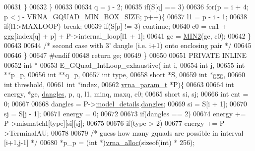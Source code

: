 \begin{DoxyCode}
00631       \}
00632     \}
00633 
00634     q = j - 2;
00635     \textcolor{keywordflow}{if}(S[q] == 3)
00636       \textcolor{keywordflow}{for}(p = i + 4; p < j - VRNA\_GQUAD\_MIN\_BOX\_SIZE; p++)\{
00637         l1    = p - i - 1;
00638         \textcolor{keywordflow}{if}(l1>MAXLOOP) \textcolor{keywordflow}{break};
00639         \textcolor{keywordflow}{if}(S[p] != 3) \textcolor{keywordflow}{continue};
00640         c0  = en1 + ggg[index[q] + p] + P->internal\_loop[l1 + 1];
00641         ge  = \hyperlink{group__utils_ga2dd4a927a7f937f43a90c144d79107d8}{MIN2}(ge, c0);
00642       \}
00643 
00644     \textcolor{comment}{/* second case with 3' dangle (i.e. i+1) onto enclosing pair */}
00645 
00646   \}
00647 \textcolor{preprocessor}{#endif}
00648   \textcolor{keywordflow}{return} ge;
00649 \}
00650 
00651 PRIVATE INLINE
00652 \textcolor{keywordtype}{int} *
00653 E\_GQuad\_IntLoop\_exhaustive( \textcolor{keywordtype}{int} i,
00654                             \textcolor{keywordtype}{int} j,
00655                             \textcolor{keywordtype}{int} **p\_p,
00656                             \textcolor{keywordtype}{int} **q\_p,
00657                             \textcolor{keywordtype}{int} type,
00658                             \textcolor{keywordtype}{short} *S,
00659                             \textcolor{keywordtype}{int} *ggg,
00660                             \textcolor{keywordtype}{int} threshold,
00661                             \textcolor{keywordtype}{int} *index,
00662                             \hyperlink{group__energy__parameters_structvrna__param__s}{vrna\_param\_t} *P)\{
00663 
00664   \textcolor{keywordtype}{int} energy, *ge, \hyperlink{group__model__details_ga72b511ed1201f7e23ec437e468790d74}{dangles}, p, q, l1, minq, maxq, c0;
00665   \textcolor{keywordtype}{short} si, sj;
00666   \textcolor{keywordtype}{int} cnt = 0;
00667 
00668   dangles = P->\hyperlink{group__energy__parameters_a7b84353eb9075c595bad4ceb871bcae7}{model\_details}.\hyperlink{structvrna__md__s_adcda4ff2ea77748ae0e8700288282efc}{dangles};
00669   si      = S[i + 1];
00670   sj      = S[j - 1];
00671   energy  = 0;
00672 
00673   \textcolor{keywordflow}{if}(dangles == 2)
00674     energy += P->mismatchI[type][si][sj];
00675 
00676   \textcolor{keywordflow}{if}(type > 2)
00677     energy += P->TerminalAU;
00678 
00679   \textcolor{comment}{/* guess how many gquads are possible in interval [i+1,j-1] */}
00680   *p\_p  = (\textcolor{keywordtype}{int} *)\hyperlink{group__utils_gaf37a0979367c977edfb9da6614eebe99}{vrna\_alloc}(\textcolor{keyword}{sizeof}(\textcolor{keywordtype}{int}) * 256);

\end{DoxyCode}
